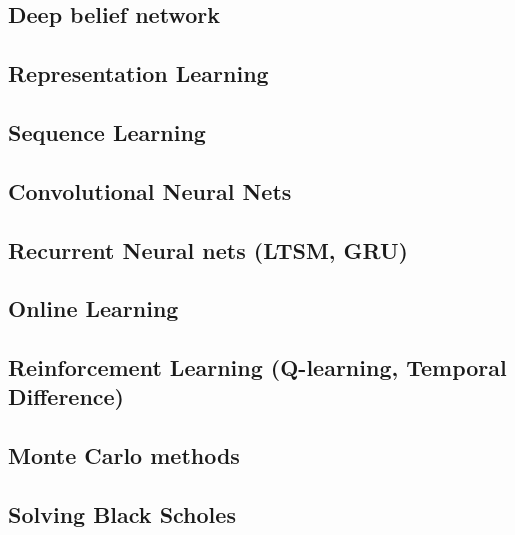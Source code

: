 \subsection{Deep belief network}

\subsection{Representation Learning}

\subsection{Sequence Learning}

\subsection{Convolutional Neural Nets}

\subsection{Recurrent Neural nets (LTSM, GRU)}

\subsection{Online Learning}

\subsection{Reinforcement Learning (Q-learning, Temporal Difference)}

\subsection{Monte Carlo methods}

\subsection{Solving Black Scholes}
